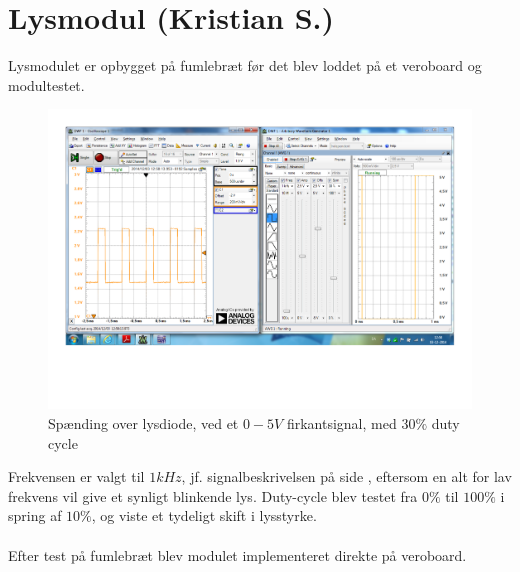 \section{Lysmodul (Kristian S.)}

Lysmodulet er opbygget på fumlebræt før det blev loddet på et veroboard og modultestet.\\

\begin{figure}[h]
	\centering
	\includegraphics[width={\textwidth},trim=50 230 520 150, clip=true]{../Implementering/billeder/Waveform(30_dutycycle).pdf}
	\caption{Spænding over lysdiode, ved et $0 - 5V$ firkantsignal, med $30\%$ duty cycle}
\end{figure}

Frekvensen er valgt til $1kHz$, jf. signalbeskrivelsen på side \pageref{tbl:signalbeskriv}, eftersom en alt for lav frekvens vil give et synligt blinkende lys. Duty-cycle blev testet fra $0\%$ til $100\%$ i spring af $10\%$, og viste et tydeligt skift i lysstyrke.\\
\\
Efter test på fumlebræt blev modulet implementeret direkte på veroboard.
